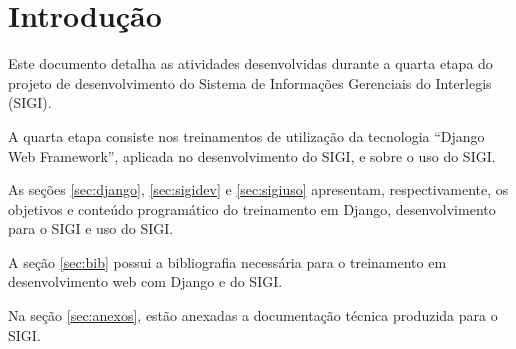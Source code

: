 %
%

\section{Introdução}
Este documento detalha as atividades desenvolvidas durante a quarta
etapa do projeto de desenvolvimento do Sistema de Informações
Gerenciais do Interlegis (SIGI).

A quarta etapa consiste nos treinamentos de utilização da tecnologia
``Django Web Framework'', aplicada no desenvolvimento do SIGI, e sobre
o uso do SIGI.

As seções \ref{sec:django}, \ref{sec:sigidev} e \ref{sec:sigiuso}
apresentam, respectivamente, os objetivos e conteúdo programático do
treinamento em Django, desenvolvimento para o SIGI e uso do SIGI.

A seção \ref{sec:bib} possui a bibliografia necessária para o
treinamento em desenvolvimento web com Django e do SIGI.

Na seção \ref{sec:anexos}, estão anexadas a documentação técnica
produzida para o SIGI.

%
%
